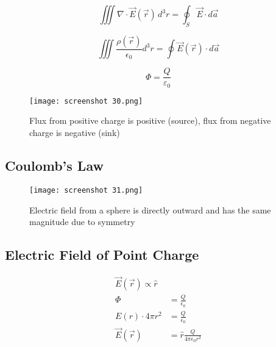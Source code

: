 \documentclass[svgnames]{article}   	%
\begin{document}
\begin{tcolorbox}	
  \[ 
  \iiint \nabla \cdot \vec{E} (\vec{r} ) \, d^3r = \oint_S \vec{E} \cdot d\vec{a}
  \]
\end{tcolorbox}	

\vspace{5px} \[
\iiint \frac{\rho(\vec{r})}{\epsilon_0} d^3r = \oint \vec{E}(\vec{r} ) \cdot
d\vec{a}
\] \vspace{5px}


\begin{tcolorbox}[colback = red!5!white, colframe = red!50!black, title = Gauss' Law]
  \[
    \Phi = \frac{Q}{\varepsilon_0}
  \]
\end{tcolorbox}


\begin{figure}[H]
  \centering
    \texttt{[image: screenshot 30.png]}
    \caption{Flux from positive charge is positive (source), flux from negative
    charge is negative (sink)}
\end{figure}


\subsection{Coulomb's Law}
\vspace{5px}


\begin{figure}[htb!]
  \centering
    \texttt{[image: screenshot 31.png]}
    \caption{Electric field from a sphere is directly outward and has the same
    magnitude due to symmetry}
\end{figure}

\subsection{Electric Field of Point Charge}
\vspace{5px}
\begin{align*}
\vec{E} (\vec{r} ) \propto \hat{r} \\
\Phi &= \frac{Q}{\epsilon_0}\\
E(r) \cdot 4\pi r^2 &= \frac{Q}{\epsilon_0}\\
\vec{E}(\vec{r} ) &= \hat{r}\frac{Q}{4\pi \epsilon_0 r^2}
\end{align*}
\end{document}
